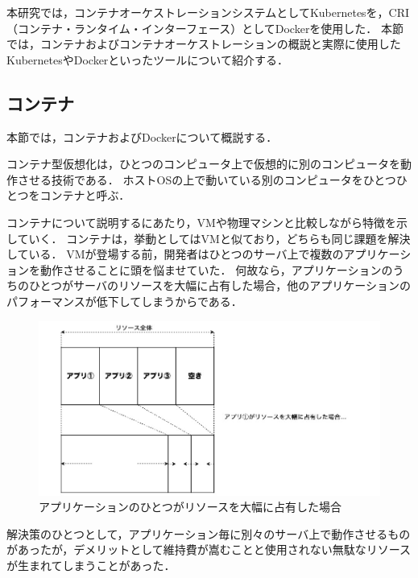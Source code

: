 本研究では，コンテナオーケストレーションシステムとしてKubernetesを，CRI（コンテナ・ランタイム・インターフェース）としてDockerを使用した．
本節では，コンテナおよびコンテナオーケストレーションの概説と実際に使用したKubernetesやDockerといったツールについて紹介する．

\subsection{コンテナ}
\label{background:container-orchestration-system:container}

本節では，コンテナおよびDockerについて概説する．

コンテナ型仮想化は，ひとつのコンピュータ上で仮想的に別のコンピュータを動作させる技術である．
ホストOSの上で動いている別のコンピュータをひとつひとつをコンテナと呼ぶ．

コンテナについて説明するにあたり，VMや物理マシンと比較しながら特徴を示していく．
コンテナは，挙動としてはVMと似ており，どちらも同じ課題を解決している．
VMが登場する前，開発者はひとつのサーバ上で複数のアプリケーションを動作させることに頭を悩ませていた．
何故なら，アプリケーションのうちのひとつがサーバのリソースを大幅に占有した場合，他のアプリケーションのパフォーマンスが低下してしまうからである．

\begin{figure}[htbp]
\begin{center}
    \includegraphics[width=\textwidth]{./figures/resource-on-physical-server.jpg}
    \caption{アプリケーションのひとつがリソースを大幅に占有した場合}
\end{center}
\end{figure}

解決策のひとつとして，アプリケーション毎に別々のサーバ上で動作させるものがあったが，デメリットとして維持費が嵩むことと使用されない無駄なリソースが生まれてしまうことがあった．

